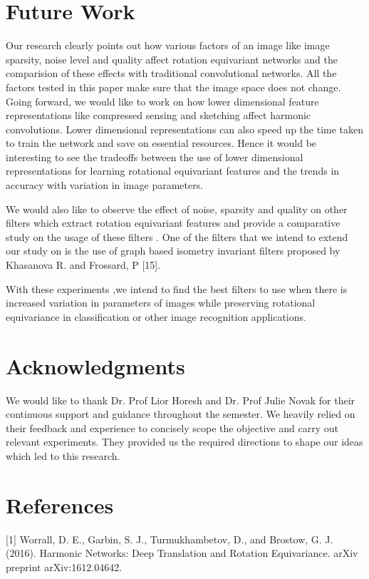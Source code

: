 \documentclass{article}
\begin{document}
\section{Future Work}
Our research clearly points out how various factors of an image like image sparsity, noise level and quality affect rotation equivariant networks and the comparision of these effects with traditional convolutional networks. All the factors tested in this paper make sure that the image space does not change. Going forward, we would like to work on how lower dimensional feature representations like compressed sensing and sketching affect harmonic convolutions. Lower dimensional representations can also speed up the time taken to train the network and save on essential resources. Hence it would be interesting to see the tradeoffs between the use of lower dimensional representations for learning rotational equivariant features and the trends in accuracy with variation in image parameters.

We would also like to observe the effect of noise, sparsity and quality on other filters which extract rotation equivariant features and provide a comparative study on the usage of these filters . One of the filters that we intend to extend our study on is the use of graph based isometry invariant filters proposed by Khasanova R. and Frossard, P [15]. 

With these experiments ,we intend to find the best filters to use when there is increased variation in parameters of images while preserving rotational equivariance in classification or other image recognition applications.

\section{Acknowledgments}
We would like to thank Dr. Prof Lior Horesh and Dr. Prof Julie Novak for their continuous support and guidance throughout the semester. We heavily relied on their feedback and experience to concisely scope the objective and carry out relevant experiments. They provided us the required directions to shape our ideas which led to this research.

\section{References}
[1] Worrall, D. E., Garbin, S. J., Turmukhambetov, D., and Brostow, G. J. (2016). Harmonic Networks: Deep Translation and Rotation Equivariance. arXiv preprint arXiv:1612.04642.
\end{document}
